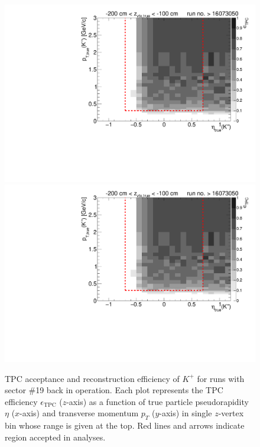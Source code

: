 \begin{figure}[hb]
	\caption[TPC acceptance and reconstruction efficiency of $K^{+}$ for runs with sector \#19 back in operation.]{TPC acceptance and reconstruction efficiency of $K^{+}$ for runs with sector \#19 back in operation. Each plot represents the TPC efficiency $\epsilon_{\text{TPC}}$ ($z$-axis) as a function of true particle pseudorapidity $\eta$ ($x$-axis) and transverse momentum $p_{T}$ ($y$-axis) in single $z$-vertex bin whose range is given at the top. Red lines and arrows indicate region accepted in analyses.}\label{fig:tpcEff_kaon_plus1}
	\centering
	\parbox{0.495\textwidth}{
		\centering
		\includegraphics[width=\linewidth,page=3]{graphics/eff/Eff2D_TPC_kaon_Plus_RunRange2.pdf}\\
		\includegraphics[width=\linewidth,page=5]{graphics/eff/Eff2D_TPC_kaon_Plus_RunRange2.pdf}\\
}
\end{figure}
